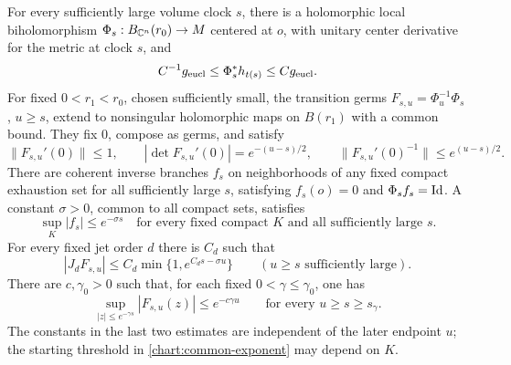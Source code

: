 \begin{proposition}\label{prop:shrinking-charts}
For every sufficiently large volume clock $s$, there is a
holomorphic local biholomorphism
$\Phi_s:B_{\mathbb C^n}(r_0)\to M$ centered at $o$, with unitary
center derivative for the metric at clock $s$, and
\begin{equation}\label{chart:uniform-chart-metric}
 C^{-1}g_{\rm eucl}\le\Phi_s^*h_{t(s)}\le Cg_{\rm eucl}.
\end{equation}
For fixed $0<r_1<r_0$, chosen sufficiently small, the transition
germs $F_{s,u}=\Phi_u^{-1}\Phi_s$, $u\ge s$, extend to
nonsingular holomorphic maps on $B(r_1)$ with a common bound.
They fix $0$, compose as germs, and satisfy
\begin{equation}\label{chart:center-transitions}
 \|F_{s,u}'(0)\|\le1,\qquad
 |\det F_{s,u}'(0)|=e^{-(u-s)/2},\qquad
 \|F_{s,u}'(0)^{-1}\|\le e^{(u-s)/2}.
\end{equation}
There are coherent inverse branches $f_s$ on neighborhoods of
any fixed compact exhaustion set for all sufficiently large
$s$, satisfying $f_s(o)=0$ and $\Phi_sf_s=\operatorname{Id}$.  A constant
$\sigma>0$, common to all compact sets, satisfies
\begin{equation}\label{chart:common-exponent}
 \sup_K|f_s|\le e^{-\sigma s}
 \quad\text{for every fixed compact }K
 \text{ and all sufficiently large }s.
\end{equation}
For every fixed jet order $d$ there is $C_d$ such that
\begin{equation}\label{chart:transition-jets}
 |J_dF_{s,u}|\le C_d\min\{1,e^{C_ds-\sigma u}\}
 \qquad(u\ge s\text{ sufficiently large}).
\end{equation}
There are $c,\gamma_0>0$ such that, for each fixed
$0<\gamma\le\gamma_0$, one has
\begin{equation}\label{chart:transition-small-balls}
 \sup_{|z|\le e^{-\gamma s}}|F_{s,u}(z)|
 \le e^{-c\gamma u}
 \qquad\text{for every }u\ge s\ge s_\gamma.
\end{equation}
The constants in the last two estimates are independent of the
later endpoint $u$; the starting threshold in
\eqref{chart:common-exponent} may depend on $K$.
\end{proposition}

